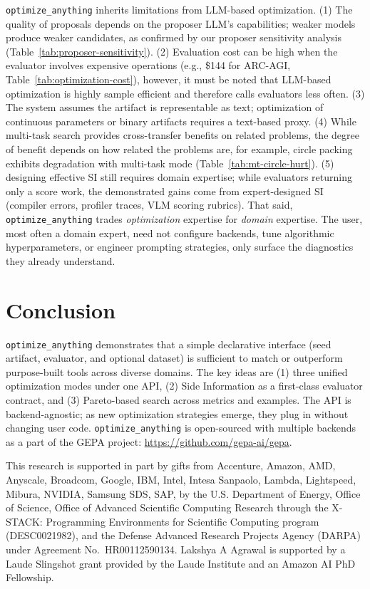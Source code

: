 \documentclass[sigconf]{acmart}
\newcommand{\oa}{\texttt{optimize\_anything}}
\begin{document}
\oa{} inherits limitations from LLM-based optimization. (1) The quality of proposals depends on the proposer LLM's capabilities; weaker models produce weaker candidates, as confirmed by our proposer sensitivity analysis (Table~\ref{tab:proposer-sensitivity}). (2) Evaluation cost can be high when the evaluator involves expensive operations (e.g., \$144 for ARC-AGI, Table~\ref{tab:optimization-cost}), however, it must be noted that LLM-based optimization is highly sample efficient and therefore calls evaluators less often. (3) The system assumes the artifact is representable as text; optimization of continuous parameters or binary artifacts requires a text-based proxy. (4) While multi-task search provides cross-transfer benefits on related problems, the degree of benefit depends on how related the problems are, for example, circle packing exhibits degradation with multi-task mode (Table~\ref{tab:mt-circle-hurt}). (5) designing effective SI still requires domain expertise; while evaluators returning only a score work, the demonstrated gains come from expert-designed SI (compiler errors, profiler traces, VLM scoring rubrics). That said, \oa{} trades \emph{optimization} expertise for \emph{domain} expertise. The user, most often a domain expert, need not configure backends, tune algorithmic hyperparameters, or engineer prompting strategies, only surface the diagnostics they already understand.


\section{Conclusion}\label{sec:conclusion}

\oa{} demonstrates that a simple declarative interface (seed artifact, evaluator, and optional dataset) is sufficient to match or outperform purpose-built tools across diverse domains. The key ideas are (1) three unified optimization modes under one API, (2) Side Information as a first-class evaluator contract, and (3) Pareto-based search across metrics and examples. The API is backend-agnostic; as new optimization strategies emerge, they plug in without changing user code. \oa{} is open-sourced with multiple backends as a part of the GEPA project: \url{https://github.com/gepa-ai/gepa}.


\begin{acks}
This research is supported in part by gifts from Accenture, Amazon, AMD, Anyscale, Broadcom, Google, IBM, Intel, Intesa Sanpaolo, Lambda, Lightspeed, Mibura, NVIDIA, Samsung SDS, SAP, by the U.S. Department of Energy, Office of Science, Office of Advanced Scientific Computing Research through the X-STACK: Programming Environments for Scientific Computing program (DESC0021982), and the Defense Advanced Research Projects Agency (DARPA) under Agreement No.\ HR00112590134. Lakshya A Agrawal is supported by a Laude Slingshot grant provided by the Laude Institute and an Amazon AI PhD Fellowship.
\end{acks}
\end{document}
